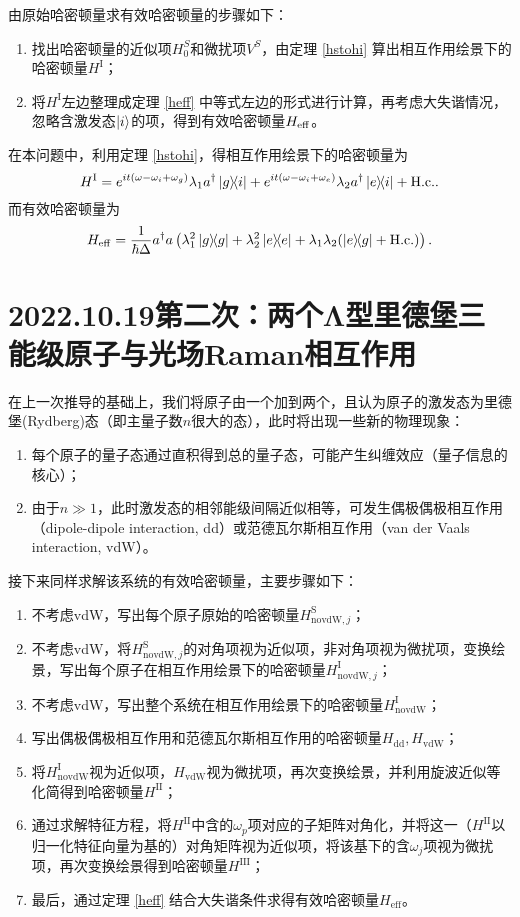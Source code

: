 \documentclass[
fontsetup = font-setup-open.tex,
titlesetup = titles-setup.tex
]{AJbook}
\numberwithin{equation}{section}
\begin{document}
由原始哈密顿量求有效哈密顿量的步骤如下：
\begin{enumerate}
\item 找出哈密顿量的近似项$ H_0^S $和微扰项$ V^S $，由定理 \ref{hstohi} 算出相互作用绘景下的哈密顿量$ H^\mathrm{I} $；
\item 将$ H^\mathrm{I} $左边整理成定理 \ref{heff} 中等式左边的形式进行计算，再考虑大失谐情况，忽略含激发态$ \ket{i} $的项，得到有效哈密顿量$ H_{\mathrm{eff}} $。
\end{enumerate}
在本问题中，利用定理 \ref{hstohi}，得相互作用绘景下的哈密顿量为
\begin{equation}\label{key}
H^\mathrm{I}=e^{it(\omega-\omega_i+\omega_g)}\lambda_1 a^\dagger\ketbra{g}{i}+e^{it(\omega-\omega_i+\omega_e)}\lambda_2 a^\dagger\ketbra{e}{i}+\mathrm{H.c.}.
\end{equation}
而有效哈密顿量为
\begin{equation}\label{key}
H_{\mathrm{eff}}=\frac{1}{\hbar\Delta}a^\dagger a\left(\lambda_1^2\ketbra{g}{g}+\lambda_2^2\ketbra{e}{e}+\lambda_1\lambda_2(\ketbra{e}{g}+\mathrm{H.c.})\right).
\end{equation}
\section[2022.10.19第二次]{2022.10.19第二次：两个Λ型里德堡三能级原子与光场Raman相互作用}
在上一次推导的基础上，我们将原子由一个加到两个，且认为原子的激发态为里德堡(Rydberg)态（即主量子数$ n $很大的态），此时将出现一些新的物理现象：
\begin{enumerate}
\item 每个原子的量子态通过直积得到总的量子态，可能产生纠缠效应（量子信息的核心）；
\item 由于$ n\gg 1 $，此时激发态的相邻能级间隔近似相等，可发生偶极偶极相互作用（dipole-dipole interaction, dd）或范德瓦尔斯相互作用（van der Vaals interaction, vdW）。
\end{enumerate}
接下来同样求解该系统的有效哈密顿量，主要步骤如下：
\begin{enumerate}
\item 不考虑vdW，写出每个原子原始的哈密顿量$ H_{\mathrm{novdW},j}^\mathrm{S} $；
\item 不考虑vdW，将$ H_{\mathrm{novdW},j}^\mathrm{S} $的对角项视为近似项，非对角项视为微扰项，变换绘景，写出每个原子在相互作用绘景下的哈密顿量$ H_{\mathrm{novdW},j}^\mathrm{I} $；
\item 不考虑vdW，写出整个系统在相互作用绘景下的哈密顿量$ H_{\mathrm{novdW}}^\mathrm{I} $；
\item 写出偶极偶极相互作用和范德瓦尔斯相互作用的哈密顿量$ H_{\mathrm{dd}},H_{\mathrm{vdW}} $；
\item 将$ H_{\mathrm{novdW}}^\mathrm{I} $视为近似项，$ H_{\mathrm{vdW}} $视为微扰项，再次变换绘景，并利用旋波近似等化简得到哈密顿量$ H^{\mathrm{II}} $；
\item 通过求解特征方程，将$ H^{\mathrm{II}} $中含的$ \omega_p $项对应的子矩阵对角化，并将这一（$ H^{\mathrm{II}} $以归一化特征向量为基的）对角矩阵视为近似项，将该基下的含$ \omega_j $项视为微扰项，再次变换绘景得到哈密顿量$ H^{\mathrm{III}} $；
\item 最后，通过定理 \ref{heff} 结合大失谐条件求得有效哈密顿量$ H_{\mathrm{eff}} $。
\end{enumerate}
\end{document}
